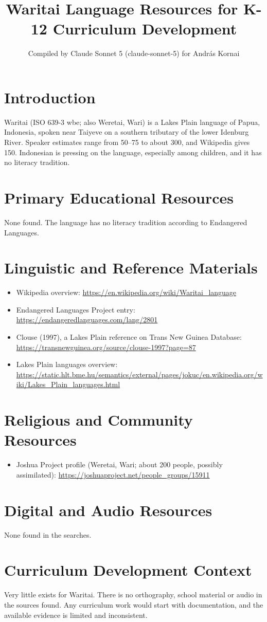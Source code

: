 \documentclass[12pt]{article}
\title{Waritai Language Resources for K-12 Curriculum Development}
\author{Compiled by Claude Sonnet 5 (claude-sonnet-5) for Andr\'as Kornai}
\date{}
\begin{document}
\maketitle
\section{Introduction}
Waritai (ISO 639-3 wbe; also Weretai, Wari) is a Lakes Plain language of Papua, Indonesia, spoken near Taiyeve on a southern tributary of the lower Idenburg River. Speaker estimates range from 50--75 to about 300, and Wikipedia gives 150. Indonesian is pressing on the language, especially among children, and it has no literacy tradition.
\section{Primary Educational Resources}
None found. The language has no literacy tradition according to Endangered Languages.
\section{Linguistic and Reference Materials}
\begin{itemize}
\item Wikipedia overview: \url{https://en.wikipedia.org/wiki/Waritai_language}
\item Endangered Languages Project entry: \url{https://endangeredlanguages.com/lang/2801}
\item Clouse (1997), a Lakes Plain reference on Trans New Guinea Database: \url{https://transnewguinea.org/source/clouse-1997?page=87}
\item Lakes Plain languages overview: \url{https://static.hlt.bme.hu/semantics/external/pages/jokuc/en.wikipedia.org/wiki/Lakes_Plain_languages.html}
\end{itemize}
\section{Religious and Community Resources}
\begin{itemize}
\item Joshua Project profile (Weretai, Wari; about 200 people, possibly assimilated): \url{https://joshuaproject.net/people_groups/15911}
\end{itemize}
\section{Digital and Audio Resources}
None found in the searches.
\section{Curriculum Development Context}
Very little exists for Waritai. There is no orthography, school material or audio in the sources found. Any curriculum work would start with documentation, and the available evidence is limited and inconsistent.
\end{document}
